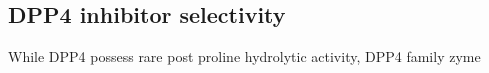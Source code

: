 \subsection{DPP4 inhibitor selectivity}
While DPP4 possess rare post proline hydrolytic activity, DPP4 family zyme
